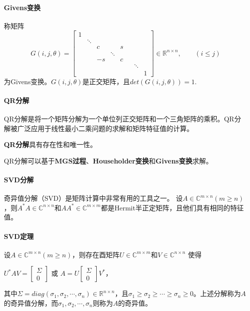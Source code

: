 \documentclass[UTF8]{article}
\begin{document}
\begin{flushleft}
\paragraph{Givens变换}
称矩阵
$$
G(i,j,\theta)=
\begin{bmatrix}
1 & & & & & \\
 & \ddots & & & & & \\
 &  & c & & s & & \\
 &  &   & \ddots &  &  & \\
 &  & -s &  & c &  & \\
 &  &   &  &  & & \ddots \\
 &  &   &  &  & & & 1
\end{bmatrix}
\in\mathbb{R}^{n \times n}, \qquad (i \leq j)
$$
为\textcolor[rgb]{0.00,0.07,1.00}{Givens变换}。$G(i,j,\theta)$是正交矩阵，且$det(G(i,j,\theta))=1$.

\paragraph{QR分解}
QR分解是将一个矩阵分解为一个\textcolor[rgb]{0.00,0.07,1.00}{单位列正交矩阵}和一个三角矩阵的乘积。QR分解被广泛应用于线性最小二乘问题的求解和矩阵特征值的计算。

\textbf{QR分解}具有\textcolor[rgb]{0.00,0.07,1.00}{存在性}和\textcolor[rgb]{0.00,0.07,1.00}{唯一性}。\vspace{1.2ex}

QR分解可以基于\textbf{\textcolor[rgb]{0.00,0.07,1.00}{MGS过程}}、\textbf{\textcolor[rgb]{0.00,0.07,1.00}{Householder变换}}和\textbf{\textcolor[rgb]{0.00,0.07,1.00}{Givens变换}}求解。

\paragraph{SVD分解}
奇异值分解（SVD）是矩阵计算中非常有用的工具之一。
设$A\in\mathbb{C}^{m \times n}(m \geq n)$，则$A^*A\in\mathbb{C}^{n \times n}$和$AA^*\in\mathbb{C}^{m \times m}$都是Hermit半正定矩阵，且他们具有相同的特征值。

\paragraph{SVD定理}
设$A\in\mathbb{C}^{m \times n}(m \geq n)$，则存在酉矩阵$U\in\mathbb{C}^{m \times m}$和$V\in\mathbb{C}^{n \times n}$ 使得
\begin{center}
$
U^*AV=
\begin{bmatrix}
\Sigma \\
0
\end{bmatrix}
$ 或 $
A=U
\begin{bmatrix}
\Sigma \\
0
\end{bmatrix}
V^*，
$
\end{center}
其中$\Sigma = diag(\sigma_1,\sigma_2,\cdots,\sigma_n)\in \mathbb{R}^{n \times n}$，且$\sigma_1 \geq \sigma_2 \geq \cdots \geq \sigma_n \geq 0$。上述分解称为$A$的奇异值分解，而$\sigma_1,\sigma_2,\cdots,\sigma_n$则称为$A$的奇异值。


\end{flushleft}
\end{document}
